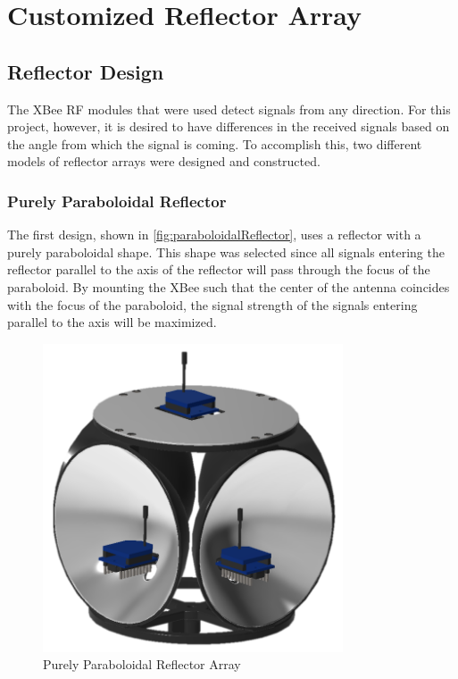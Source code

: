\chapter{Customized Reflector Array}
\label{ch: Chapter3}

\section{Reflector Design}
The XBee RF modules that were used detect signals from any direction. For this project, however, it is desired to have differences in the received signals based on the angle from which the signal is coming. To accomplish this, two different models of reflector arrays were designed and constructed.

\subsection{Purely Paraboloidal Reflector}
The first design, shown in \autoref{fig:paraboloidalReflector}, uses a reflector with a purely paraboloidal shape. This shape was selected since all signals entering the reflector parallel to the axis of the reflector will pass through the focus of the paraboloid. By mounting the XBee such that the center of the antenna coincides with the focus of the paraboloid, the signal strength of the signals entering parallel to the axis will be maximized.
\begin{figure}
    \centering
    \includegraphics[width=3.5in]{figs/img/paraboloidalReflector.png}
    \caption{Purely Paraboloidal Reflector Array}
    \label{fig:paraboloidalReflector}
\end{figure}

